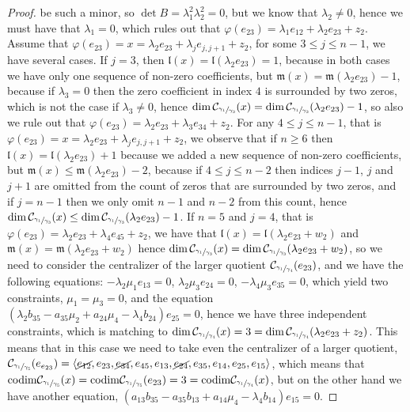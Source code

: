\documentclass[12pt]{article}
\newcommand*\circled[1]{\tikz[baseline=(char.base)]{
            \small \node[shape=circle,draw,inner sep=1pt] (char) {#1};}}
\begin{document}
\begin{proof}
be such a minor, so $\det B=\lambda_1^2\lambda_2^2=0$, but we know that $\lambda_2\neq 0$, hence we must have that $\lambda_1=0$, which rules out that $\varphi(e_{23})=\lambda_1 e_{12}+\lambda_2 e_{23}+z_2$. Assume that $\varphi(e_{23})=x=\lambda_2 e_{23}+\lambda_j e_{j,j+1}+z_2$, for some $3\leq j\leq n-1$, we have several cases. If $j=3$, then $\mathfrak{l}(x)=\mathfrak{l}(\lambda_2 e_{23})=1$, because in both cases we have only one sequence of non-zero coefficients, but $\mathfrak{m}(x)=\mathfrak{m}(\lambda_2 e_{23})-1$, because if $\lambda_3=0$ then the zero coefficient in index $4$ is surrounded by two zeros, which is not the case if $\lambda_3\neq 0$, hence $\dim\mathcal{C}_{\sfrac{\gamma_1}{\gamma_3}}(x)=\dim\mathcal{C}_{\sfrac{\gamma_1}{\gamma_3}}(\lambda_2 e_{23})-1$, so also we rule out that $\varphi(e_{23})=\lambda_2 e_{23}+\lambda_3 e_{34}+z_2$. For any $4\leq j\leq n-1$, that is $\varphi(e_{23})=x=\lambda_2 e_{23}+\lambda_j e_{j,j+1}+z_2$, we observe that if $n\geq 6$ then $\mathfrak{l}(x)=\mathfrak{l}(\lambda_2 e_{23})+1$ because we added a new sequence of non-zero coefficients, but $\mathfrak{m}(x)\leq\mathfrak{m}(\lambda_2 e_{23})-2$, because if $4\leq j\leq n-2$ then indices $j-1$, $j$ and $j+1$ are omitted from the count of zeros that are surrounded by two zeros, and if $j=n-1$ then we only omit $n-1$ and $n-2$ from this count, hence $\dim\mathcal{C}_{\sfrac{\gamma_1}{\gamma_3}}(x)\leq\dim\mathcal{C}_{\sfrac{\gamma_1}{\gamma_3}}(\lambda_2 e_{23})-1$. If $n=5$ and $j=4$, that is $\varphi(e_{23})=\lambda_2 e_{23}+\lambda_4 e_{45}+z_2$, we have that $\mathfrak{l}(x)=\mathfrak{l}(\lambda_2 e_{23}+w_2)$ and $\mathfrak{m}(x)=\mathfrak{m}(\lambda_2 e_{23}+w_2)$ hence $\dim\mathcal{C}_{\sfrac{\gamma_1}{\gamma_3}}(x)=\dim\mathcal{C}_{\sfrac{\gamma_1}{\gamma_3}}(\lambda_2 e_{23}+w_2)$, so we need to consider the centralizer of the larger quotient $\mathcal{C}_{\sfrac{\gamma_1}{\gamma_4}}(e_{23})$, and we have the following equations: \circled{1} $-\lambda_2\mu_1 e_{13}=0$, \circled{2} $\lambda_2\mu_3 e_{24}=0$, \circled{3} $-\lambda_4\mu_3 e_{35}=0$, which yield two constraints, $\mu_1=\mu_3=0$, and the equation \circled{4} $(\lambda_2 b_{35}-a_{35}\mu_2+a_{24}\mu_4-\lambda_4 b_{24})e_{25}=0$, hence we have three independent constraints, which is matching to $\dim\mathcal{C}_{\sfrac{\gamma_1}{\gamma_4}}(x)=3=\dim\mathcal{C}_{\sfrac{\gamma_1}{\gamma_4}}(\lambda_2 e_{23}+z_2)$. This means that in this case we need to take even the centralizer of a larger quotient, $\mathcal{C}_{\sfrac{\gamma_1}{\gamma_5}}(e_{e_{23}})=\langle \cancel{e_{12}},e_{23},\cancel{e_{34}},e_{45},e_{13},\cancel{e_{24}},e_{35},e_{14},e_{25},e_{15}\rangle$, which means that $\mathrm{codim}\mathcal{C}_{\sfrac{\gamma_1}{\gamma_5}}(x)=\mathrm{codim}\mathcal{C}_{\sfrac{\gamma_1}{\gamma_5}}(e_{23})=3=\mathrm{codim}\mathcal{C}_{\sfrac{\gamma_1}{\gamma_4}}(x)$, but on the other hand we have another equation, \circled{5} $(a_{13}b_{35}-a_{35}b_{13}+a_{14}\mu_4-\lambda_4 b_{14})e_{15}=0$.

\end{proof}
\end{document}
